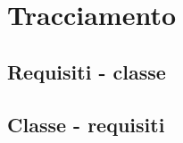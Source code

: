 \documentclass[12pt,a4paper]{article}
\begin{document}


\newpage

\section{Tracciamento}

\subsection{Requisiti - classe}


\newpage

\subsection{Classe - requisiti}

\end{document}
